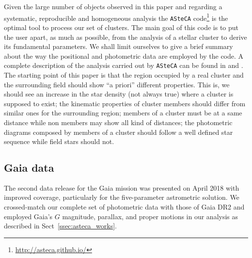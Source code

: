 \documentclass[draft]{aa}
\begin{document}
Given the large number of objects observed in this paper and regarding a
systematic, reproducible and homogeneous analysis the \texttt{ASteCA}
code\footnote{\url{http://asteca.github.io/}} is the optimal tool
to process our set of clusters. The main goal of this code is to put the user
apart, as much as possible, from the analysis of a stellar cluster to derive
its fundamental parameters. We shall limit ourselves to give a brief summary
about the way the positional and photometric data are employed by the code.
A complete description of the analysis carried out by
\texttt{ASteCA} can be found in \cite{Perren_2015} and \cite{Perren_2017}.
The starting point of this paper is that the region occupied by a real cluster
and the surrounding field should show ``a priori'' different properties. This
is, we should see an increase in the star density (not always true) where a
cluster is supposed to exist; the kinematic properties of cluster members
should differ from similar ones for the surrounding region; members of a
cluster must be at a same distance while non members may show all kind of
distances; the photometric diagrams composed by members of a cluster should
follow a well defined star sequence while field stars should not. 



\subsection{Gaia data}
\label{ssec:gaia_data}

The second data release for the Gaia mission \citep{GaiaDR2_2018} was presented
on April 2018 with improved coverage, particularly for the five-parameter
astrometric solution.
We crossed-match our complete set of photometric data with those of Gaia DR2
and employed Gaia's $G$ magnitude, parallax, and proper motions in our
analysis as described in Sect~\ref{ssec:asteca_works}.
\end{document}
